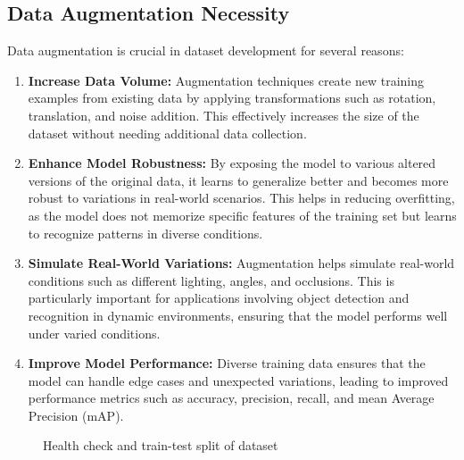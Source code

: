 \documentclass[conference]{IEEEtran}
\begin{document}
\subsection{Data Augmentation Necessity}
Data augmentation is crucial in dataset development for several reasons:
\begin{enumerate}
  \item \textbf{Increase Data Volume:} Augmentation techniques create new training examples from existing data by applying transformations such as rotation, translation, and noise addition. This effectively increases the size of the dataset without needing additional data collection.
  \item \textbf{Enhance Model Robustness:} By exposing the model to various altered versions of the original data, it learns to generalize better and becomes more robust to variations in real-world scenarios. This helps in reducing overfitting, as the model does not memorize specific features of the training set but learns to recognize patterns in diverse conditions.
  \item \textbf{Simulate Real-World Variations:} Augmentation helps simulate real-world conditions such as different lighting, angles, and occlusions. This is particularly important for applications involving object detection and recognition in dynamic environments, ensuring that the model performs well under varied conditions.
  \item \textbf{Improve Model Performance:} Diverse training data ensures that the model can handle edge cases and unexpected variations, leading to improved performance metrics such as accuracy, precision, recall, and mean Average Precision (mAP).
\end{enumerate}

\begin{figure}[htbp]
  \centering
   \vfill
  \caption{Health check and train-test split of dataset}
  \label{fig:prob3-c}
\end{figure}
\end{document}
